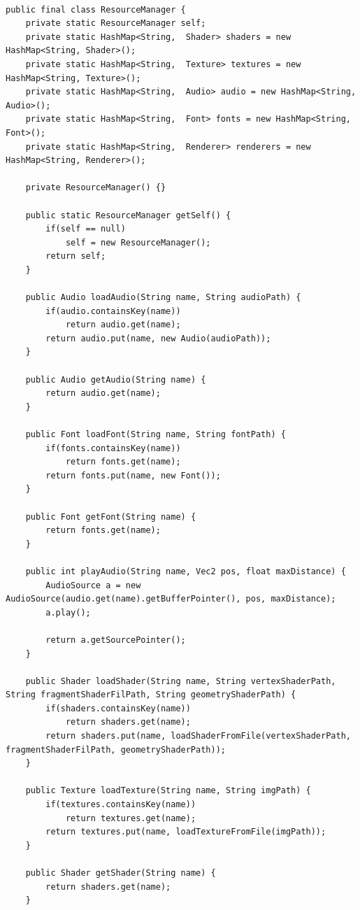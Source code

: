 \documentclass[12pt, 
openright, 
oneside, 
a4paper,    
brazil]{facom-ufu-abntex2}
\begin{document}
\begin{apendicesenv}
\begin{lstlisting}[caption=Classe Resource Manager]
 
public final class ResourceManager {
    private static ResourceManager self;
    private static HashMap<String,  Shader> shaders = new HashMap<String, Shader>();
    private static HashMap<String,  Texture> textures = new HashMap<String, Texture>();
    private static HashMap<String,  Audio> audio = new HashMap<String, Audio>();
    private static HashMap<String,  Font> fonts = new HashMap<String, Font>();
    private static HashMap<String,  Renderer> renderers = new HashMap<String, Renderer>();

    private ResourceManager() {}
     
    public static ResourceManager getSelf() {
        if(self == null) 
            self = new ResourceManager();
        return self;
    }
     
    public Audio loadAudio(String name, String audioPath) {
        if(audio.containsKey(name))
            return audio.get(name);
        return audio.put(name, new Audio(audioPath));
    }
     
    public Audio getAudio(String name) {
        return audio.get(name);
    }
     
    public Font loadFont(String name, String fontPath) {
        if(fonts.containsKey(name))
            return fonts.get(name);
        return fonts.put(name, new Font());
    }
     
    public Font getFont(String name) {
        return fonts.get(name);
    }
     
    public int playAudio(String name, Vec2 pos, float maxDistance) {
        AudioSource a = new AudioSource(audio.get(name).getBufferPointer(), pos, maxDistance);
        a.play();
         
        return a.getSourcePointer();
    }

    public Shader loadShader(String name, String vertexShaderPath, String fragmentShaderFilPath, String geometryShaderPath) {
        if(shaders.containsKey(name))
            return shaders.get(name);
        return shaders.put(name, loadShaderFromFile(vertexShaderPath, fragmentShaderFilPath, geometryShaderPath));
    }

    public Texture loadTexture(String name, String imgPath) {
        if(textures.containsKey(name))
            return textures.get(name);
        return textures.put(name, loadTextureFromFile(imgPath));
    }
     
    public Shader getShader(String name) {
        return shaders.get(name);
    }
     

\end{lstlisting}
\end{apendicesenv}
\end{document}
